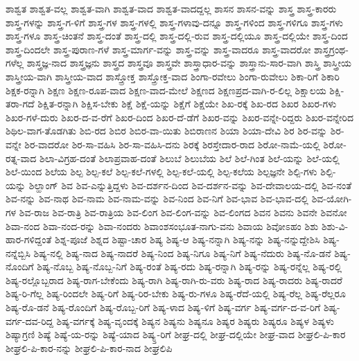 {ಶಾಶ್ವತ
ಶಾಶ್ವತ-ವಲ್ಲ
ಶಾಶ್ವತ-ವಾಗಿ
ಶಾಶ್ವತ-ವಾದ
ಶಾಶ್ವತ-ವಾದದ್ದಲ್ಲ
ಶಾಸನ
ಶಾಸನ-ವನ್ನು
ಶಾಸ್ತ್ರ
ಶಾಸ್ತ್ರ-ಕಾರರು
ಶಾಸ್ತ್ರ-ಗಳನ್ನು
ಶಾಸ್ತ್ರ-ಗ-ಳಿಗೆ
ಶಾಸ್ತ್ರ-ಗಳ
ಶಾಸ್ತ್ರ-ಗಳಲ್ಲಿ
ಶಾಸ್ತ್ರ-ಗಳಾವು-ದನ್ನೂ
ಶಾಸ್ತ್ರ-ಗಳಿಂದ
ಶಾಸ್ತ್ರ-ಗಳಿಗೂ
ಶಾಸ್ತ್ರ-ಗಳು
ಶಾಸ್ತ್ರ-ಗಳೂ
ಶಾಸ್ತ್ರ-ಚಿಂತನೆ
ಶಾಸ್ತ್ರ-ದಂತೆ
ಶಾಸ್ತ್ರ-ದಲ್ಲಿ
ಶಾಸ್ತ್ರ-ದಲ್ಲಿ-ರುವ
ಶಾಸ್ತ್ರ-ದಲ್ಲಿಯೂ
ಶಾಸ್ತ್ರ-ದಲ್ಲಿಯೇ
ಶಾಸ್ತ್ರ-ದಿಂದ
ಶಾಸ್ತ್ರ-ದಿಂದಲೇ
ಶಾಸ್ತ್ರ-ಪುರಾಣ-ಗಳೆ
ಶಾಸ್ತ್ರ-ಮಾರ್ಗ-ವನ್ನು
ಶಾಸ್ತ್ರ-ವನ್ನು
ಶಾಸ್ತ್ರ-ವಾದರೂ
ಶಾಸ್ತ್ರ-ವಾದರೋ
ಶಾಸ್ತ್ರಗ್ರಂಥ-ಗಳೆಲ್ಲ
ಶಾಸ್ತ್ರಜ್ಞ-ನಾದ
ಶಾಸ್ತ್ರಜ್ಞನು
ಶಾಸ್ತ್ರದ
ಶಾಸ್ತ್ರವೂ
ಶಾಸ್ತ್ರವೇ
ಶಾಸ್ತ್ರಾಧಾರ-ವನ್ನು
ಶಾಸ್ತ್ರಾನು-ಸಾರ-ವಾಗಿ
ಶಾಸ್ತ್ರಿ
ಶಾಸ್ತ್ರೀಯ
ಶಾಸ್ತ್ರೀಯ-ವಾಗಿ
ಶಾಸ್ತ್ರೀಯ-ವಾದ
ಶಾಸ್ತ್ರೋಕ್ತ
ಶಾಸ್ತ್ರೋಕ್ತ-ವಾದ
ಶಿಂಗಾ-ರವೇಲು
ಶಿಂಗಾ-ರುವೇಲು
ಶಿಕಾ-ರಿಗೆ
ಶಿಕಾರಿ
ಶಿಕ್ಷಕ-ರನ್ನಾಗಿ
ಶಿಕ್ಷಣ
ಶಿಕ್ಷಣ-ರೂಪ-ವಾದ
ಶಿಕ್ಷಣ-ವಾದ-ಮೇಲೆ
ಶಿಕ್ಷಣದ
ಶಿಕ್ಷಣಪ್ರದ-ವಾಗಿ-ರ-ಲಿಲ್ಲ
ಶಿಕ್ಷಾಲಯ
ಶಿಕ್ಷಿ-ತರಾ-ಗದೆ
ಶಿಕ್ಷಿತ-ರನ್ನಾಗಿ
ಶಿಕ್ಷಿಸ-ಬೇಕು
ಶಿಕ್ಷೆ
ಶಿಕ್ಷೆ-ಯನ್ನು
ಶಿಕ್ಷೆಗೆ
ಶಿಕ್ಷೆಯೇ
ಶಿಖ-ರಕ್ಕೆ
ಶಿಖ-ರದ
ಶಿಖರ
ಶಿಖರ-ಗಳು
ಶಿಖರ-ಗಳೆ-ದುರು
ಶಿಖರ-ದ-ವ-ರೆಗೆ
ಶಿಖರ-ದಿಂದ
ಶಿಖರ-ದೆ-ಡೆಗೆ
ಶಿಖರ-ವನ್ನು
ಶಿಖರ-ವನ್ನೇ-ರಿದ್ದರು
ಶಿಖರ-ವನ್ನೇರಿದ
ಶಿಥಿಲ-ವಾಗ-ತೊಡಗಿತು
ಶಿಬಿ-ರದ
ಶಿಬಿರ
ಶಿಬಿರ-ವಾ-ಯಿತು
ಶಿಬಿರಾಣನ
ಶಿಯಾ
ಶಿಯಾ-ದೇವಿ
ಶಿರ
ಶಿರ-ವನ್ನು
ಶಿರ-ವನ್ನೇ
ಶಿರ-ವಾದರೋ
ಶಿರ-ಸಾ-ವಹಿಸಿ
ಶಿರ-ಸಾ-ವಹಿಸಿ-ದನು
ಶಿರಕ್ಕೆ
ಶಿರಸ್ತೇದಾರ-ರಾದ
ಶಿರೋ-ನಾಮೆ-ಯಲ್ಲಿ
ಶಿರೋ-ರತ್ನ-ವಾದ
ಶಿಲಾ-ವಿಗ್ರಹ-ದಂತೆ
ಶಿಲಾಪ್ರವಾಹ-ದಂತೆ
ಶಿಲುಬೆ
ಶಿಲುಬೆಯ
ಶಿಲೆ
ಶಿಲೆ-ಗಿಂತ
ಶಿಲೆ-ಯನ್ನು
ಶಿಲೆ-ಯಲ್ಲಿ
ಶಿಲೆ-ಯಿಂದ
ಶಿಲೆಯ
ಶಿಲ್ಪ
ಶಿಲ್ಪ-ಕಲೆ
ಶಿಲ್ಪ-ಕಲೆ-ಗಳಲ್ಲಿ
ಶಿಲ್ಪ-ಕಲೆ-ಯಲ್ಲಿ
ಶಿಲ್ಪ-ಕಲೆಯ
ಶಿಲ್ಪಜ್ಞನೇ
ಶಿಲ್ಪಿ-ಗಳು
ಶಿಲ್ಪಿ-ಯನ್ನು
ಶಿಲ್ಹಾಂಗ್
ಶಿವ
ಶಿವ-ಎನ್ನುತ್ತಿದ್ದಳು
ಶಿವ-ದರ್ಶನ-ದಿಂದ
ಶಿವ-ದರ್ಶನ-ವನ್ನು
ಶಿವ-ದೇವಾಲಯ-ದಲ್ಲಿ
ಶಿವ-ನಂತೆ
ಶಿವ-ನನ್ನು
ಶಿವ-ನಾಥ
ಶಿವ-ನಾಮ
ಶಿವ-ನಾಮ-ವನ್ನು
ಶಿವ-ನಿಂದ
ಶಿವ-ನಿಗೆ
ಶಿವ-ಭಾವ
ಶಿವ-ಭಾವ-ದಲ್ಲಿ
ಶಿವ-ಯೋಗಿ-ಗಳ
ಶಿವ-ರಾಜ
ಶಿವ-ರಾತ್ರಿ
ಶಿವ-ರಾತ್ರಿಯ
ಶಿವ-ಲಿಂಗ
ಶಿವ-ಲಿಂಗ-ವನ್ನು
ಶಿವ-ಲಿಂಗದ
ಶಿವನ
ಶಿವನು
ಶಿವನೇ
ಶಿವನೋ
ಶಿವಾ-ನಂದ
ಶಿವಾ-ನಂದ-ರನ್ನು
ಶಿವಾ-ನಂದರು
ಶಿವಾಂಶಸಂಭೂತ-ನಾಗು-ವನು
ಶಿವಾಯ
ಶಿವೋಽಹಂ
ಶಿಶು
ಶಿಶು-ವಿ-ಹಾರ-ಗಳಿದ್ದಂತೆ
ಶಿಶ್ನ-ಪೂಜೆ
ಶಿಶ್ನದ
ಶಿಷ್ಟಾ-ಚಾರ
ಶಿಷ್ಯ
ಶಿಷ್ಯ-ಆ
ಶಿಷ್ಯ-ನನ್ನಾಗಿ
ಶಿಷ್ಯ-ನನ್ನು
ಶಿಷ್ಯ-ನನ್ನುದ್ದೇಶಿಸಿ
ಶಿಷ್ಯ-ನನ್ನೆಬ್ಬಿಸಿ
ಶಿಷ್ಯ-ನಲ್ಲಿ
ಶಿಷ್ಯ-ನಾದ
ಶಿಷ್ಯ-ನಾದರೆ
ಶಿಷ್ಯ-ನಿಂದ
ಶಿಷ್ಯ-ನಿಗೂ
ಶಿಷ್ಯ-ನಿಗೆ
ಶಿಷ್ಯ-ನೆದುರು
ಶಿಷ್ಯ-ನೊ-ಡನೆ
ಶಿಷ್ಯ-ನೊಂದಿಗೆ
ಶಿಷ್ಯ-ನೊಬ್ಬ
ಶಿಷ್ಯ-ನೊಬ್ಬ-ನಿಗೆ
ಶಿಷ್ಯ-ರಂತೆ
ಶಿಷ್ಯ-ರದು
ಶಿಷ್ಯ-ರನ್ನಾಗಿ
ಶಿಷ್ಯ-ರನ್ನು
ಶಿಷ್ಯ-ರನ್ನೆಲ್ಲ
ಶಿಷ್ಯ-ರಲ್ಲಿ
ಶಿಷ್ಯ-ರಲ್ಲೊಬ್ಬರಾದ
ಶಿಷ್ಯ-ರಾಗ-ಬೇಕೆಂದು
ಶಿಷ್ಯ-ರಾಗಿ
ಶಿಷ್ಯ-ರಾಗಿ-ರು-ವರು
ಶಿಷ್ಯ-ರಾದ
ಶಿಷ್ಯ-ರಾದರು
ಶಿಷ್ಯ-ರಾದರೆ
ಶಿಷ್ಯ-ರಿ-ಗೆಲ್ಲ
ಶಿಷ್ಯ-ರಿಂದಲೇ
ಶಿಷ್ಯ-ರಿಗೆ
ಶಿಷ್ಯ-ರಿರ-ಬೇಕು
ಶಿಷ್ಯ-ರು-ಗಳೂ
ಶಿಷ್ಯ-ರೆದೆ-ಯಲ್ಲಿ
ಶಿಷ್ಯ-ರೆಲ್ಲ
ಶಿಷ್ಯ-ರೆಲ್ಲರೂ
ಶಿಷ್ಯ-ರೊ-ಡನೆ
ಶಿಷ್ಯ-ರೊಂದಿಗೆ
ಶಿಷ್ಯ-ರೊಬ್ಬ-ರಿಗೆ
ಶಿಷ್ಯ-ಳಾದ
ಶಿಷ್ಯ-ಳಿಗೆ
ಶಿಷ್ಯ-ವರ್ಗ
ಶಿಷ್ಯ-ವರ್ಗ-ದ-ವ-ರಿಗೆ
ಶಿಷ್ಯ-ವರ್ಗ-ದವ-ರಿದ್ದ
ಶಿಷ್ಯ-ವರ್ಗಕ್ಕೆ
ಶಿಷ್ಯ-ವೃಂದಕ್ಕೆ
ಶಿಷ್ಯನ
ಶಿಷ್ಯನು
ಶಿಷ್ಯನೂ
ಶಿಷ್ಯರ
ಶಿಷ್ಯರು
ಶಿಷ್ಯರೂ
ಶಿಷ್ಯಳ
ಶಿಷ್ಯಳು
ಶಿಷ್ಯಾಗ್ರಣಿ
ಶಿಷ್ಯೆ
ಶಿಷ್ಯೆ-ಯ-ರನ್ನು
ಶಿಷ್ಯೆ-ಯಾದ
ಶಿಷ್ಯ್ತ-ರಿಗೆ
ಶೀಘ್ರ-ದಲ್ಲಿ
ಶೀಘ್ರ-ದಲ್ಲಿಯೇ
ಶೀಘ್ರ-ವಾದ
ಶೀಘ್ರಲಿ-ಪಿ-ಕಾರ
ಶೀಘ್ರಲಿ-ಪಿ-ಕಾರ-ನನ್ನು
ಶೀಘ್ರಲಿ-ಪಿ-ಕಾರ-ನಾದ
ಶೀಘ್ರಲಿಪಿ
}
